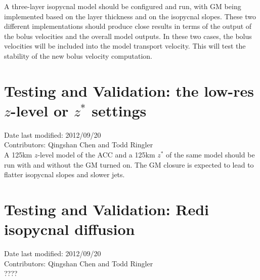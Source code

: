 \documentclass[12pt]{report}
\begin{document}
A three-layer isopycnal model should be configured and run, with GM
being implemented based on the layer thickness and on the isopycnal
slopes. These two different implementations should produce close
results in terms of the output of the bolus velocities and the
overall model outputs. In these two cases, the bolus velocities will be included into the model transport velocity. This will test the stability of the new bolus velocity computation.

\section{Testing and Validation: the low-res $z$-level or $z^\ast$ settings}
Date last modified: 2012/09/20 \\
Contributors: Qingshan Chen and Todd Ringler\\

A 125km $z$-level model of the ACC and a 125km $z^\ast$ of the same
model should be run with and without the GM turned on. The GM closure
is expected to lead to flatter isopycnal slopes and slower jets.


\section{Testing and Validation: Redi isopycnal diffusion}
Date last modified: 2012/09/20 \\
Contributors: Qingshan Chen and Todd Ringler\\

????





\end{document}
